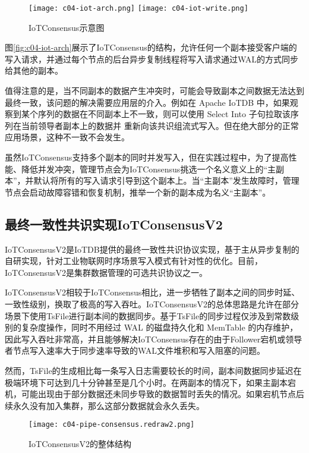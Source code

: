 \begin{figure}
  \centering
    {\texttt{[image: c04-iot-arch.png]}}
    {\texttt{[image: c04-iot-write.png]}}
  \caption{IoTConsensus示意图}
  \label{fig:c04-iot-consensus}
\end{figure}

图\ref{fig:c04-iot-arch}展示了IoTConsensus的结构，允许任何一个副本接受客户端的写入请求，并通过每个节点的后台异步复制线程将写入请求通过WAL的方式同步给其他的副本。


值得注意的是，当不同副本的数据产生冲突时，可能会导致副本之间数据无法达到最终一致，该问题的解决需要应用层的介入。例如在 Apache IoTDB 中，如果观察到某个序列的数据在不同副本上不一致，则可以使用 Select Into 子句拉取该序列在当前领导者副本上的数据并
重新向该共识组流式写入。但在绝大部分的正常应用场景，这种不一致不会发生。

虽然IoTConsensus支持多个副本的同时并发写入，但在实践过程中，为了提高性能、降低并发冲突，管理节点会为IoTConsensus挑选一个名义意义上的“主副本”，并默认将所有的写入请求引导到这个副本上。当“主副本”发生故障时，管理节点会启动故障容错和恢复机制，推举一个新的副本成为名义“主副本”。


\subsection{最终一致性共识实现IoTConsensusV2}

IoTConsensusV2是IoTDB提供的最终一致性共识协议实现，基于主从异步复制的自研实现，针对工业物联网时序场景写入模式有针对性的优化。目前，IoTConsensusV2是集群数据管理的可选共识协议之一。

IoTConsensusV2相较于IoTConsensus相比，进一步牺牲了副本之间的同步时延、一致性级别，换取了极高的写入吞吐。IoTConsensusV2的总体思路是允许在部分场景下使用TsFile进行副本间的数据同步。基于TsFile的同步过程仅涉及到常数级别的复杂度操作，同时不用经过 WAL 的磁盘持久化和 MemTable 的内存维护，因此写入吞吐非常高，并且能够解决IoTConsensus存在的由于Follower宕机或领导者节点写入速率大于同步速率导致的WAL文件堆积和写入阻塞的问题。

然而，TsFile的生成相比每一条写入日志需要较长的时间，副本间数据同步延迟在极端环境下可达到几十分钟甚至是几个小时。在两副本的情况下，如果主副本宕机，可能出现由于部分数据还未同步导致的数据暂时丢失的情况。如果宕机节点后续永久没有加入集群，那么这部分数据就会永久丢失。

\begin{figure}
    \centering
    \texttt{[image: c04-pipe-consensus.redraw2.png]}
    \caption{IoTConsensusV2的整体结构}
    \label{fig:c04-pipe-consensus}
  \end{figure}
  
